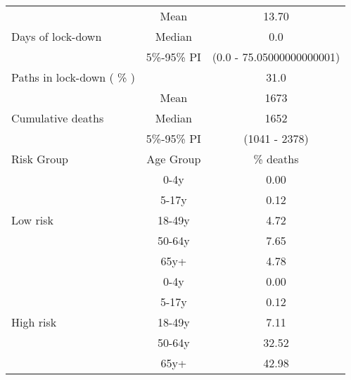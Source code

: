 \documentclass{article}
\begin{document}
\begin{table}[th]
\centering
\begin{tabular}{p{4cm}cc}
\toprule
\multirow{3}{*}{Days   of lock-down} & Mean      & 13.70                        \\ \cmidrule(l){2-3} 
                                     & Median    & 0.0                      \\ \cmidrule(l){2-3} 
                                     & 5\%-95\% PI & (0.0 - 75.05000000000001)       \\ \midrule 
\multirow{1}{*}{Paths in lock-down ( \% )} &      &         31.0              \\   \midrule                     
\multirow{3}{\hsize}{Cumulative deaths}       & Mean      & 1673 \\ \cmidrule(l){2-3} 
                                     & Median    & 1652                        \\ \cmidrule(l){2-3} 
                                     & 5\%-95\% PI & (1041 - 2378)           \\  \midrule
Risk Group                           & Age Group & \multicolumn{1}{c}{\% deaths}        \\  \midrule
\multirow{5}{*}{Low   risk}          & 0-4y      & 0.00                         \\ \cmidrule(l){2-3} 
                                     & 5-17y     & 0.12                         \\ \cmidrule(l){2-3} 
                                     & 18-49y    & 4.72                         \\ \cmidrule(l){2-3} 
                                     & 50-64y    & 7.65                         \\ \cmidrule(l){2-3} 
                                     & 65y+      & 4.78                         \\ \midrule
\multirow{5}{*}{High   risk}         & 0-4y      & 0.00                         \\ \cmidrule(l){2-3} 
                                     & 5-17y     & 0.12                         \\ \cmidrule(l){2-3} 
                                     & 18-49y    & 7.11                         \\ \cmidrule(l){2-3} 
                                     & 50-64y    & 32.52                         \\ \cmidrule(l){2-3} 
                                     & 65y+      & 42.98                         \\ \midrule

\end{tabular}
\end{table}
\end{document}
